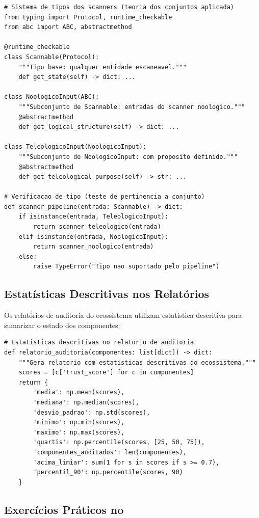 \begin{lstlisting}[style=pythonstyle]
# Sistema de tipos dos scanners (teoria dos conjuntos aplicada)
from typing import Protocol, runtime_checkable
from abc import ABC, abstractmethod

@runtime_checkable
class Scannable(Protocol):
    """Tipo base: qualquer entidade escaneavel."""
    def get_state(self) -> dict: ...

class NoologicoInput(ABC):
    """Subconjunto de Scannable: entradas do scanner noologico."""
    @abstractmethod
    def get_logical_structure(self) -> dict: ...

class TeleologicoInput(NoologicoInput):
    """Subconjunto de NoologicoInput: com proposito definido."""
    @abstractmethod
    def get_teleological_purpose(self) -> str: ...

# Verificacao de tipo (teste de pertinencia a conjunto)
def scanner_pipeline(entrada: Scannable) -> dict:
    if isinstance(entrada, TeleologicoInput):
        return scanner_teleologico(entrada)
    elif isinstance(entrada, NoologicoInput):
        return scanner_noologico(entrada)
    else:
        raise TypeError("Tipo nao suportado pelo pipeline")
\end{lstlisting}

\subsection{Estatísticas Descritivas nos Relatórios}

Os relatórios de auditoria do ecossistema utilizam estatística descritiva
para sumarizar o estado dos componentes:

\begin{lstlisting}[style=pythonstyle]
# Estatisticas descritivas no relatorio de auditoria
def relatorio_auditoria(componentes: list[dict]) -> dict:
    """Gera relatorio com estatisticas descritivas do ecossistema."""
    scores = [c['trust_score'] for c in componentes]
    return {
        'media': np.mean(scores),
        'mediana': np.median(scores),
        'desvio_padrao': np.std(scores),
        'minimo': np.min(scores),
        'maximo': np.max(scores),
        'quartis': np.percentile(scores, [25, 50, 75]),
        'componentes_auditados': len(componentes),
        'acima_limiar': sum(1 for s in scores if s >= 0.7),
        'percentil_90': np.percentile(scores, 90)
    }
\end{lstlisting}

\subsection{Exercícios Práticos no \opencodeeco{}}


